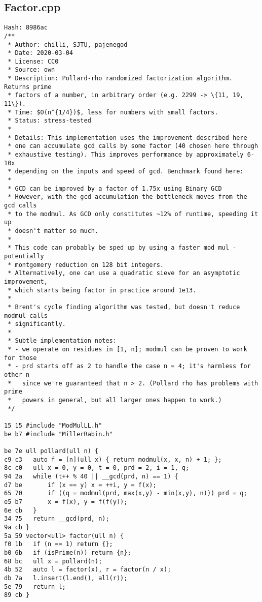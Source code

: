 \documentclass[11pt, a4paper, twoside]{article}
\begin{document}
\subsection{Factor.cpp}
\begin{lstlisting}
Hash: 8986ac
/**
 * Author: chilli, SJTU, pajenegod
 * Date: 2020-03-04
 * License: CC0
 * Source: own
 * Description: Pollard-rho randomized factorization algorithm. Returns prime
 * factors of a number, in arbitrary order (e.g. 2299 -> \{11, 19, 11\}).
 * Time: $O(n^{1/4})$, less for numbers with small factors.
 * Status: stress-tested
 *
 * Details: This implementation uses the improvement described here
 * one can accumulate gcd calls by some factor (40 chosen here through
 * exhaustive testing). This improves performance by approximately 6-10x
 * depending on the inputs and speed of gcd. Benchmark found here:
 *
 * GCD can be improved by a factor of 1.75x using Binary GCD
 * However, with the gcd accumulation the bottleneck moves from the gcd calls
 * to the modmul. As GCD only constitutes ~12% of runtime, speeding it up
 * doesn't matter so much.
 *
 * This code can probably be sped up by using a faster mod mul - potentially
 * montgomery reduction on 128 bit integers.
 * Alternatively, one can use a quadratic sieve for an asymptotic improvement,
 * which starts being factor in practice around 1e13.
 *
 * Brent's cycle finding algorithm was tested, but doesn't reduce modmul calls
 * significantly.
 *
 * Subtle implementation notes:
 * - we operate on residues in [1, n]; modmul can be proven to work for those
 * - prd starts off as 2 to handle the case n = 4; it's harmless for other n
 *   since we're guaranteed that n > 2. (Pollard rho has problems with prime
 *   powers in general, but all larger ones happen to work.)
 */

15 15 #include "ModMulLL.h"
be b7 #include "MillerRabin.h"

be 7e ull pollard(ull n) {
c9 c3 	auto f = [n](ull x) { return modmul(x, x, n) + 1; };
8c c0 	ull x = 0, y = 0, t = 0, prd = 2, i = 1, q;
94 2a 	while (t++ % 40 || __gcd(prd, n) == 1) {
d7 be 		if (x == y) x = ++i, y = f(x);
65 70 		if ((q = modmul(prd, max(x,y) - min(x,y), n))) prd = q;
e5 b7 		x = f(x), y = f(f(y));
6e cb 	}
34 75 	return __gcd(prd, n);
9a cb }
5a 59 vector<ull> factor(ull n) {
f0 1b 	if (n == 1) return {};
b0 6b 	if (isPrime(n)) return {n};
68 bc 	ull x = pollard(n);
4b 52 	auto l = factor(x), r = factor(n / x);
db 7a 	l.insert(l.end(), all(r));
5e 79 	return l;
89 cb }
\end{lstlisting}
\end{document}
